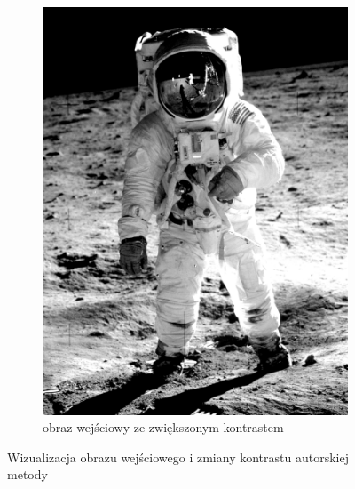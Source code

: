 \begin{figure}[H]
\begin{subfigure}{0.49\textwidth}
            \includegraphics[width = \textwidth]{img/4-mine/input-input_c20.png}
            \caption{obraz wejściowy ze zwiększonym kontrastem}
            \label{mine-input-1-b}
        \end{subfigure}
        \caption{Wizualizacja obrazu wejściowego i zmiany kontrastu autorskiej metody}
        \label{mine-input-1}
    \end{figure}
        
